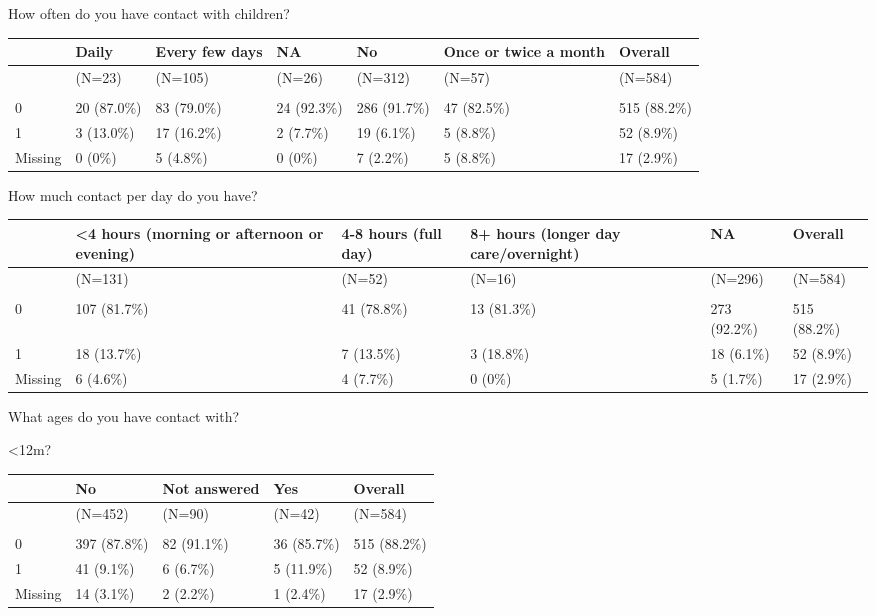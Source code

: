 \documentclass[
]{article}
\begin{document}
How often do you have contact with children?

\begin{tabular}[t]{lllllll}
\toprule
  & Daily & Every few days & NA & No & Once or twice a month & Overall\\
\midrule
 & (N=23) & (N=105) & (N=26) & (N=312) & (N=57) & (N=584)\\
\addlinespace[0.3em]
\multicolumn{7}{l}{\textbf{piab\_pos}}\\
\hspace{1em}0 & 20 (87.0\%) & 83 (79.0\%) & 24 (92.3\%) & 286 (91.7\%) & 47 (82.5\%) & 515 (88.2\%)\\
\hspace{1em}1 & 3 (13.0\%) & 17 (16.2\%) & 2 (7.7\%) & 19 (6.1\%) & 5 (8.8\%) & 52 (8.9\%)\\
\hspace{1em}Missing & 0 (0\%) & 5 (4.8\%) & 0 (0\%) & 7 (2.2\%) & 5 (8.8\%) & 17 (2.9\%)\\
\bottomrule
\end{tabular}

How much contact per day do you have?

\begin{tabular}[t]{llllll}
\toprule
  & <4 hours (morning or afternoon or evening) & 4-8 hours (full day) & 8+ hours (longer day care/overnight) & NA & Overall\\
\midrule
 & (N=131) & (N=52) & (N=16) & (N=296) & (N=584)\\
\addlinespace[0.3em]
\multicolumn{6}{l}{\textbf{piab\_pos}}\\
\hspace{1em}0 & 107 (81.7\%) & 41 (78.8\%) & 13 (81.3\%) & 273 (92.2\%) & 515 (88.2\%)\\
\hspace{1em}1 & 18 (13.7\%) & 7 (13.5\%) & 3 (18.8\%) & 18 (6.1\%) & 52 (8.9\%)\\
\hspace{1em}Missing & 6 (4.6\%) & 4 (7.7\%) & 0 (0\%) & 5 (1.7\%) & 17 (2.9\%)\\
\bottomrule
\end{tabular}

What ages do you have contact with?

\textless12m?

\begin{tabular}[t]{lllll}
\toprule
  & No & Not answered & Yes & Overall\\
\midrule
 & (N=452) & (N=90) & (N=42) & (N=584)\\
\addlinespace[0.3em]
\multicolumn{5}{l}{\textbf{piab\_pos}}\\
\hspace{1em}0 & 397 (87.8\%) & 82 (91.1\%) & 36 (85.7\%) & 515 (88.2\%)\\
\hspace{1em}1 & 41 (9.1\%) & 6 (6.7\%) & 5 (11.9\%) & 52 (8.9\%)\\
\hspace{1em}Missing & 14 (3.1\%) & 2 (2.2\%) & 1 (2.4\%) & 17 (2.9\%)\\
\bottomrule
\end{tabular}
\end{document}
